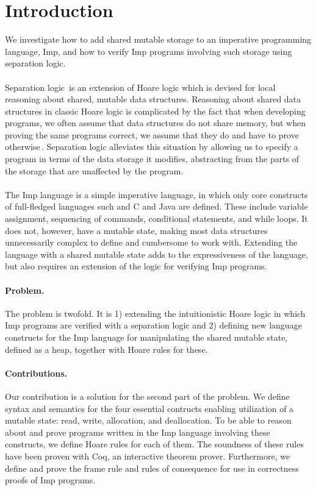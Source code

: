 \section{Introduction}
We investigate how to add shared mutable storage to an imperative programming language, Imp, and how to verify Imp programs involving such storage using separation logic.
\paragraph{}
Separation logic\,\cite{Reynolds02} is an extension of Hoare logic which is devised for local reasoning about shared, mutable data structures. Reasoning about shared data structures in classic Hoare logic is complicated by the fact that when developing programs, we often assume that data structures do not share memory, but when proving the same programs correct, we assume that they do and have to prove otherwise\,\cite{reynolds2008AnIntroductionTo}. Separation logic alleviates this situation by allowing us to specify a program in terms of the data storage it modifies, abstracting from the parts of the storage that are unaffected by the program. 
\paragraph{}
The Imp language is a simple imperative language, in which only  core constructs of full-fledged languages such and C and Java are defined. These include variable assignment, sequencing of commands, conditional statements, and while loops. It does not, however, have a mutable state, making most data structures unnecessarily complex to define and cumbersome to work with. Extending the language with a shared mutable state adds to the expressiveness of the language, but also requires an extension of the logic for verifying Imp programs.

\paragraph{Problem.}
The problem is twofold. It is 1) extending the intuitionistic Hoare logic in which Imp programs are verified with a separation logic and 2) defining new language constructs for the Imp language for manipulating the shared mutable state, defined as a heap, together with Hoare rules for these.


\paragraph{Contributions.}
Our contribution is a solution for the second part of the problem. We define syntax and semantics for the four essential contructs enabling utilization of a mutable state: read, write, allocation, and deallocation. To be able to reason about and prove programs written in the Imp language involving these constructs, we define Hoare rules for each of them. The soundness of these rules have been proven with Coq, an interactive theorem prover. Furthermore, we define and prove the frame rule and rules of consequence for use in correctness proofs of Imp programs.

